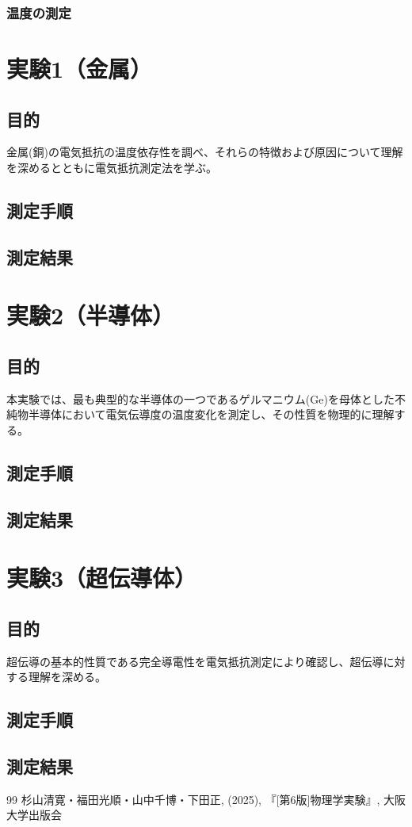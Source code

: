 \documentclass[11pt, titlepage, openany]{ltjsbook}
\begin{document}
\subsection{温度の測定}



\chapter{実験1（金属）}

\section{目的}
金属(銅)の電気抵抗の温度依存性を調べ、それらの特徴および原因について理解を深めるとともに電気抵抗測定法を学ぶ。
\section{測定手順}
\section{測定結果}


\chapter{実験2（半導体）}

\section{目的}
本実験では、最も典型的な半導体の一つであるゲルマニウム(Ge)を母体とした不純物半導体において電気伝導度の温度変化を測定し、その性質を物理的に理解する。
\section{測定手順}
\section{測定結果}

\chapter{実験3（超伝導体）}

\section{目的}
超伝導の基本的性質である完全導電性を電気抵抗測定により確認し、超伝導に対する理解を深める。
\section{測定手順}
\section{測定結果}


\begin{thebibliography}{99}
 杉山清寛・福田光順・山中千博・下田正, (2025), 『[第6版]物理学実験』, 大阪大学出版会
\end{thebibliography}
\end{document}
